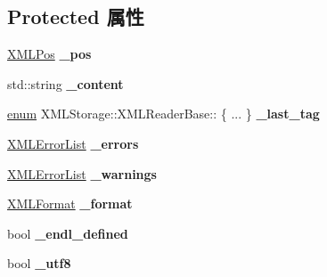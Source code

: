 \subsection*{Protected 属性}
\begin{DoxyCompactItemize}
\item 
\mbox{\label{struct_x_m_l_storage_1_1_x_m_l_reader_base_ad8a49f6ba14dfa708066c0ddbeab1e7d}} 
\hyperlink{struct_x_m_l_storage_1_1_x_m_l_pos}{X\+M\+L\+Pos} {\bfseries \+\_\+pos}
\item 
\mbox{\label{struct_x_m_l_storage_1_1_x_m_l_reader_base_a6578483e48b2de9b22957c495432d46b}} 
std\+::string {\bfseries \+\_\+content}
\item 
\mbox{\label{struct_x_m_l_storage_1_1_x_m_l_reader_base_a274b562841f1e4983428366d6b39d8e8}} 
\hyperlink{interfaceenum}{enum} X\+M\+L\+Storage\+::\+X\+M\+L\+Reader\+Base\+:: \{ ... \}  {\bfseries \+\_\+last\+\_\+tag}
\item 
\mbox{\label{struct_x_m_l_storage_1_1_x_m_l_reader_base_a4da79a315ecaff4ab72fa85fd43e6d6c}} 
\hyperlink{struct_x_m_l_storage_1_1_x_m_l_error_list}{X\+M\+L\+Error\+List} {\bfseries \+\_\+errors}
\item 
\mbox{\label{struct_x_m_l_storage_1_1_x_m_l_reader_base_a65dad55180fd9b351d00e82b55413690}} 
\hyperlink{struct_x_m_l_storage_1_1_x_m_l_error_list}{X\+M\+L\+Error\+List} {\bfseries \+\_\+warnings}
\item 
\mbox{\label{struct_x_m_l_storage_1_1_x_m_l_reader_base_a9627bbb1df1ed59df8d8230684964562}} 
\hyperlink{struct_x_m_l_storage_1_1_x_m_l_format}{X\+M\+L\+Format} {\bfseries \+\_\+format}
\item 
\mbox{\label{struct_x_m_l_storage_1_1_x_m_l_reader_base_ac7a1033d1b7f09832f64868fe6e2250a}} 
bool {\bfseries \+\_\+endl\+\_\+defined}
\item 
\mbox{\label{struct_x_m_l_storage_1_1_x_m_l_reader_base_a219e50992bead065f79f17736c40d434}} 
bool {\bfseries \+\_\+utf8}
\end{DoxyCompactItemize}


